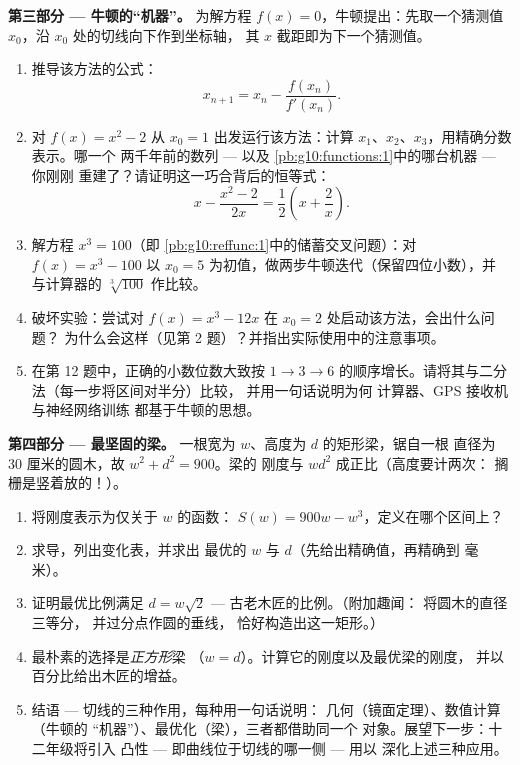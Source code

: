 \begin{problem}
\medskip
\noindent\textbf{第三部分 --- 牛顿的“机器”。}
为解方程 $f(x) = 0$，牛顿提出：先取一个猜测值
$x_0$，沿 $x_0$ 处的切线向下作到坐标轴，
其 $x$ 截距即为下一个猜测值。
\begin{enumerate}[resume]
  \item 推导该方法的公式：
        \[
        x_{n + 1} = x_n - \frac{f(x_n)}{f'(x_n)} .
        \]
  \item 对 $f(x) = x^2 - 2$ 从 $x_0 = 1$ 出发运行该方法：计算
        $x_1$、$x_2$、$x_3$，用精确分数表示。哪一个
        两千年前的数列 --- 以及
        \cref{pb:g10:functions:1}中的哪台机器 --- 你刚刚
        重建了？请证明这一巧合背后的恒等式：
        \[
        x - \frac{x^2 - 2}{2x} = \frac12\left(x +
        \frac2x\right).
        \]
  \item 解方程 $x^3 = 100$（即
        \cref{pb:g10:reffunc:1}中的储蓄交叉问题）：对
        $f(x) = x^3 - 100$ 以 $x_0 = 5$ 为初值，做两步牛顿迭代（保留四位小数），并
        与计算器的 $\sqrt[3]{100}$ 作比较。
  \item 破坏实验：尝试对
        $f(x) = x^3 - 12x$ 在 $x_0 = 2$ 处启动该方法，会出什么问题？
        为什么会这样（见第 2 题）？并指出实际使用中的注意事项。
  \item 在第 12 题中，正确的小数位数大致按
        $1 \to 3 \to 6$ 的顺序增长。请将其与二分法（每一步将区间对半分）比较，
        并用一句话说明为何
        计算器、GPS 接收机与神经网络训练
        都基于牛顿的思想。
\end{enumerate}

\medskip
\noindent\textbf{第四部分 --- 最坚固的梁。}
一根宽为 $w$、高度为 $d$ 的矩形梁，锯自一根
直径为 $30$ 厘米的圆木，故 $w^2 + d^2 = 900$。梁的
刚度与 $w d^2$ 成正比（高度要计两次：
搁栅是竖着放的！）。
\begin{enumerate}[resume]
  \item 将刚度表示为仅关于 $w$ 的函数：
        $S(w) = 900w - w^3$，定义在哪个区间上？
  \item 求导，列出变化表，并求出
        最优的 $w$ 与 $d$（先给出精确值，再精确到
        毫米）。
  \item 证明最优比例满足
        $d = w\sqrt2$ --- 古老木匠的比例。（附加趣闻：
        将圆木的直径三等分，
        并过分点作圆的垂线，
        恰好构造出这一矩形。）
  \item 最朴素的选择是\emph{正方形}梁
        （$w = d$）。计算它的刚度以及最优梁的刚度，
        并以百分比给出木匠的增益。
  \item 结语 --- 切线的三种作用，每种用一句话说明：
        几何（镜面定理）、数值计算（牛顿的
        “机器”）、最优化（梁），三者都借助同一个
        对象。展望下一步：十二年级将引入
        凸性 --- 即曲线位于切线的哪一侧 --- 用以
        深化上述三种应用。
\end{enumerate}
\end{problem}
